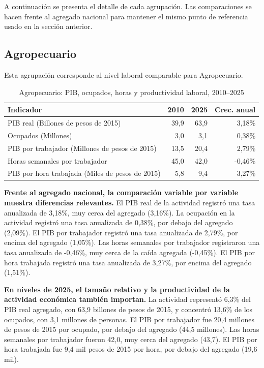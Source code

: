A continuación se presenta el detalle de cada agrupación. Las comparaciones se hacen frente al agregado nacional para mantener el mismo punto de referencia usado en la sección anterior.

\subsection{Agropecuario}

Esta agrupación corresponde al nivel laboral comparable para Agropecuario.

\begin{table}[H]
\centering
\caption{Agropecuario: PIB, ocupados, horas y productividad laboral, 2010--2025}
\label{tab:agg25_a_productividad}
\small
\begin{tabular}{lrrr}
\toprule
Indicador & 2010 & 2025 & Crec. anual \\
\midrule
PIB real  (Billones de pesos de 2015) & 39,9 & 63,9 & 3,18\% \\
Ocupados (Millones) & 3,0 & 3,1 & 0,38\% \\
PIB por trabajador (Millones de pesos de 2015) & 13,5 & 20,4 & 2,79\% \\
Horas semanales por trabajador & 45,0 & 42,0 & -0,46\% \\
PIB por hora trabajada (Miles de pesos de 2015) & 5,8 & 9,4 & 3,27\% \\
\bottomrule
\end{tabular}
\end{table}

\textbf{Frente al agregado nacional, la comparación variable por variable muestra diferencias relevantes.} El PIB real de la actividad registró una tasa anualizada de 3,18\%, muy cerca del agregado (3,16\%). La ocupación en la actividad registró una tasa anualizada de 0,38\%, por debajo del agregado (2,09\%). El PIB por trabajador registró una tasa anualizada de 2,79\%, por encima del agregado (1,05\%). Las horas semanales por trabajador registraron una tasa anualizada de -0,46\%, muy cerca de la caída agregada (-0,45\%). El PIB por hora trabajada registró una tasa anualizada de 3,27\%, por encima del agregado (1,51\%).

\textbf{En niveles de 2025, el tamaño relativo y la productividad de la actividad económica también importan.} La actividad representó 6,3\% del PIB real agregado, con 63,9 billones de pesos de 2015, y concentró 13,6\% de los ocupados, con 3,1 millones de personas. El PIB por trabajador fue 20,4 millones de pesos de 2015 por ocupado, por debajo del agregado (44,5 millones). Las horas semanales por trabajador fueron 42,0, muy cerca del agregado (43,7). El PIB por hora trabajada fue 9,4 mil pesos de 2015 por hora, por debajo del agregado (19,6 mil).

